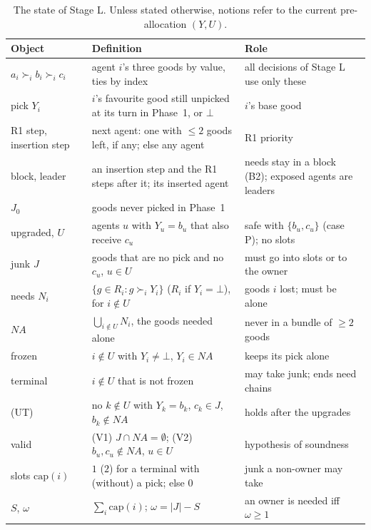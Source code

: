 \documentclass[runningheads,11pt]{llncs}
\newcommand{\NA}{\mathit{NA}}
\newcommand{\capa}{\mathrm{cap}}
\newcommand{\none}{\bot}
\newcommand{\st}{\mathrel{:}}
\begin{document}
\begin{table}[p]
\caption{The state of Stage L. Unless stated otherwise, notions refer to the current pre-allocation $(Y,U)$.}\label{tab:dict}
\centering\small
\setlength{\tabcolsep}{4pt}\begin{tabular}{@{}>{\raggedright\arraybackslash}p{}>{\raggedright\arraybackslash}p{}>{\raggedright\arraybackslash}p{}@{}}
\toprule
Object & Definition & Role \\
\midrule
$a_i\succ_i b_i\succ_i c_i$ & agent $i$'s three goods by value, ties by index & all decisions of Stage L use only these \\
pick $Y_i$ & $i$'s favourite good still unpicked at its turn in Phase~1, or $\none$ & $i$'s base good \\
R1 step, insertion step & next agent: one with $\le2$ goods left, if any; else any agent & R1 priority \\
block, leader & an insertion step and the R1 steps after it; its inserted agent & needs stay in a block (B2); exposed agents are leaders \\
$J_0$ & goods never picked in Phase~1 & \\
upgraded, $U$ & agents $u$ with $Y_u=b_u$ that also receive $c_u$ & safe with $\{b_u,c_u\}$ (case P); no slots \\
junk $J$ & goods that are no pick and no $c_u$, $u\in U$ & must go into slots or to the owner \\
needs $N_i$ & $\{g\in R_i\st g\succ_i Y_i\}$ ($R_i$ if $Y_i=\none$), for $i\notin U$ & goods $i$ lost; must be alone \\
$\NA$ & $\bigcup_{i\notin U}N_i$, the goods needed alone & never in a bundle of $\ge2$ goods \\
frozen & $i\notin U$ with $Y_i\ne\none$, $Y_i\in\NA$ & keeps its pick alone \\
terminal & $i\notin U$ that is not frozen & may take junk; ends need chains \\
(UT) & no $k\notin U$ with $Y_k=b_k$, $c_k\in J$, $b_k\notin\NA$ & holds after the upgrades \\
valid & (V1) $J\cap\NA=\emptyset$; (V2) $b_u,c_u\notin\NA$, $u\in U$ & hypothesis of soundness \\
slots $\capa(i)$ & $1$ ($2$) for a terminal with (without) a pick; else $0$ & junk a non-owner may take \\
$S$, $\omega$ & $\sum_i\capa(i)$; $\omega=|J|-S$ & an owner is needed iff $\omega\ge1$ \\

\end{tabular}
\end{table}
\end{document}
